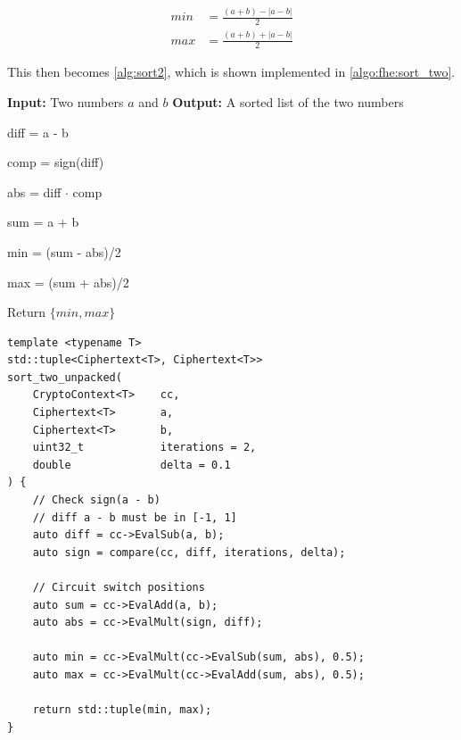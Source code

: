 \begin{align}
    \label{eq:min}
    min &= \frac{(a + b) - |a - b|}{2} \\
    \label{eq:max}
    max &= \frac{(a + b) + |a - b|}{2}
\end{align}

This then becomes \autoref{alg:sort2}, which is shown implemented in \autoref{algo:fhe:sort_two}.

\begin{algorithm}
\caption{Homomorphic sorting of two numbers}
\label{alg:sort2}
\begin{algorithmic}[1] %
    \State \textbf{Input:} Two numbers $a$ and $b$
    \State \textbf{Output:} A sorted list of the two numbers
    
    diff = a - b
    
    comp = sign(diff)
    
    abs = diff $\cdot$ comp
    
    sum = a + b

    min = (sum - abs)/2
    
    max = (sum + abs)/2
    
    \State Return $\{min, max\}$
\end{algorithmic}
\end{algorithm}


\begin{algorithm}
\caption{Sort two numbers homomorphically.}
\label{algo:fhe:sort_two}
\begin{verbatim}
template <typename T>
std::tuple<Ciphertext<T>, Ciphertext<T>> 
sort_two_unpacked(
    CryptoContext<T>    cc, 
    Ciphertext<T>       a, 
    Ciphertext<T>       b, 
    uint32_t            iterations = 2, 
    double              delta = 0.1
) {
    // Check sign(a - b)
    // diff a - b must be in [-1, 1]
    auto diff = cc->EvalSub(a, b);
    auto sign = compare(cc, diff, iterations, delta);

    // Circuit switch positions
    auto sum = cc->EvalAdd(a, b);
    auto abs = cc->EvalMult(sign, diff);

    auto min = cc->EvalMult(cc->EvalSub(sum, abs), 0.5);
    auto max = cc->EvalMult(cc->EvalAdd(sum, abs), 0.5);
    
    return std::tuple(min, max);
}
\end{verbatim}
\end{algorithm}



